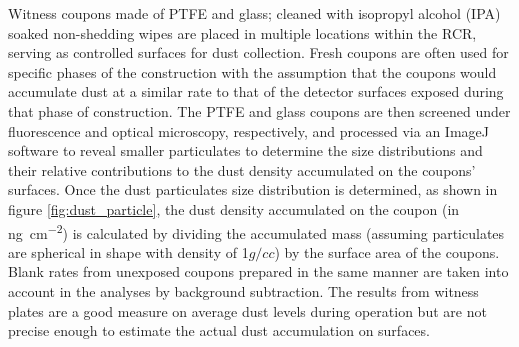 Witness coupons made of PTFE and glass; cleaned with isopropyl alcohol (IPA) soaked non-shedding wipes are placed in multiple locations within the RCR, serving as controlled surfaces for dust collection. Fresh coupons are often used for specific phases of the construction with the assumption that the coupons would accumulate dust at a similar rate to that of the detector surfaces exposed during that phase of construction. The PTFE and glass coupons are then screened under fluorescence and optical microscopy, respectively, and processed via an ImageJ software \cite{DBLP:journals/corr/RuedenSHDWE17} to reveal smaller particulates to determine the size distributions and their relative contributions to the dust density accumulated on the coupons' surfaces. Once the dust particulates size distribution is determined, as shown in figure \ref{fig:dust_particle}, the dust density accumulated on the coupon (in \si{\nano\g\per\cm\squared}) is calculated by dividing the accumulated mass (assuming particulates are spherical in shape with density of 1${g/cc}$) by the surface area of the coupons. Blank rates from unexposed coupons prepared in the same manner are taken into account in the analyses by background subtraction. The results from witness plates are a good measure on average dust levels during operation but are not precise enough to estimate the actual dust accumulation on surfaces.
%
